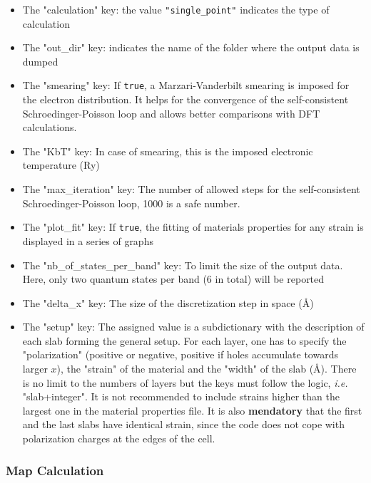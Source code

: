 \documentclass[a4paper,12pt]{article}
\newcommand{\angstrom}{\textup{\AA}}
\begin{document}
\begin{itemize}
\item The "calculation" key: the value \texttt{"single\_point"} indicates the type of calculation

\item The "out\_dir" key: indicates the name of the folder where the output data is dumped

\item The "smearing" key: If \texttt{true}, a Marzari-Vanderbilt smearing is imposed for the electron distribution. It helps for the convergence of the self-consistent Schroedinger-Poisson loop and allows better comparisons with DFT calculations.

\item The "KbT" key: In case of smearing, this is the imposed electronic temperature (Ry)

\item The "max\_iteration" key: The number of allowed steps for the self-consistent Schroedinger-Poisson loop, 1000 is a safe number.

\item The "plot\_fit" key: If \texttt{true}, the fitting of materials properties for any strain is displayed in a series of graphs

\item The "nb\_of\_states\_per\_band" key: To limit the size of the output data. Here, only two quantum states per band (6 in total) will be reported

\item The "delta\_x" key: The size of the discretization step in space (\angstrom)

\item The "setup" key: The assigned value is a subdictionary with the description of each slab forming the general setup. For each layer, one has to specify the "polarization" (positive or negative, positive if holes accumulate towards larger $x$), the "strain" of the material and the "width" of the slab (\angstrom). There is no limit to the numbers of layers but the keys must follow the logic, \textit{i.e.} "slab+integer". It is not recommended to include strains higher than the largest one in the material properties file. It is also \textbf{mendatory} that the first and the last slabs have identical strain, since the code does not cope with polarization charges at the edges of the cell.
\end{itemize}

\subsubsection{Map Calculation}
\end{document}
